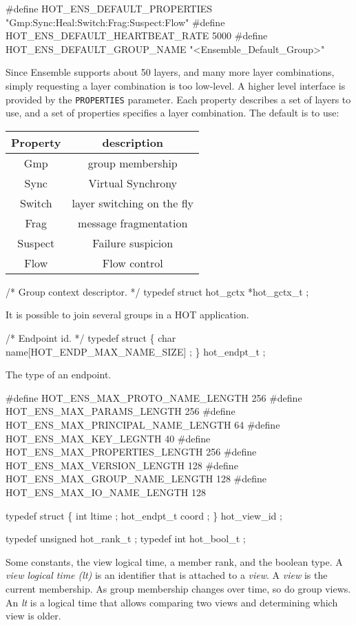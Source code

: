 \documentclass[11pt]{article}
\begin{document}
\begin{codebox}
#define HOT_ENS_DEFAULT_PROPERTIES "Gmp:Sync:Heal:Switch:Frag:Suspect:Flow"
#define HOT_ENS_DEFAULT_HEARTBEAT_RATE 5000
#define HOT_ENS_DEFAULT_GROUP_NAME "<Ensemble_Default_Group>"
\end{codebox}
Since Ensemble supports about 50 layers, and many more layer
combinations, simply requesting a layer combination is too
low-level. A higher level interface is provided by the {\tt PROPERTIES}
parameter. Each property describes a set of layers to use, and a set
of properties specifies a layer combination. The default is to use: \newline
\vspace{1mm}

\begin{tabular}{|c|c|} \hline
Property & description \\ \hline
Gmp & group membership \\
Sync & Virtual Synchrony \\
Switch & layer switching on the fly \\
Frag & message fragmentation  \\
Suspect & Failure suspicion \\ 
Flow & Flow control \\ \hline
\end{tabular}

\begin{codebox}
/* Group context descriptor.
 */
typedef struct hot_gctx *hot_gctx_t ;
\end{codebox}
It is possible to join several groups in a HOT application.

\begin{codebox}
/* Endpoint id.
 */
typedef struct \{ 
  char name[HOT_ENDP_MAX_NAME_SIZE] ; 
\} hot_endpt_t ;
\end{codebox}
The type of an endpoint.

\begin{codebox}
#define HOT_ENS_MAX_PROTO_NAME_LENGTH 256
#define HOT_ENS_MAX_PARAMS_LENGTH 256
#define HOT_ENS_MAX_PRINCIPAL_NAME_LENGTH 64
#define HOT_ENS_MAX_KEY_LEGNTH     40
#define HOT_ENS_MAX_PROPERTIES_LENGTH 256
#define HOT_ENS_MAX_VERSION_LENGTH 128
#define HOT_ENS_MAX_GROUP_NAME_LENGTH 128
#define HOT_ENS_MAX_IO_NAME_LENGTH 128

typedef struct \{
  int ltime ;
  hot_endpt_t coord ;
\} hot_view_id ;

typedef unsigned hot_rank_t ;
typedef int hot_bool_t ;
\end{codebox}
Some constants, the view logical time, a member rank, and the boolean
type. A {\it view logical time (lt)} is an identifier that is attached to a
{\it view}. A {\it view} is the current membership. As group
membership changes over time, so do group views. An {\it lt} is a logical
time that allows comparing two views and determining which view is
older. 
\end{document}
